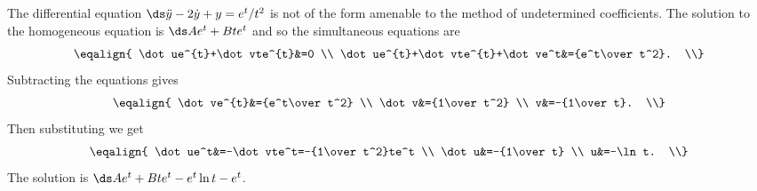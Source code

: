 \begin{example} The differential equation $\ds\ddot y -2\dot y+y=e^t/t^2$ is
not of the form amenable to the method of undetermined
coefficients. The solution to the homogeneous equation is
$\ds Ae^t+Bte^t$ and so the simultaneous equations are
$$\eqalign{
\dot ue^{t}+\dot vte^{t}&=0 \\
\dot ue^{t}+\dot vte^{t}+\dot ve^t&={e^t\over t^2}. \\}
$$
Subtracting the equations gives
$$\eqalign{
\dot ve^{t}&={e^t\over t^2} \\
\dot v&={1\over t^2} \\
v&=-{1\over t}. \\}
$$
Then substituting we get
$$\eqalign{
\dot ue^t&=-\dot vte^t=-{1\over t^2}te^t \\
\dot u&=-{1\over t} \\
u&=-\ln t. \\}
$$
The solution is $\ds Ae^t+Bte^t-e^t\ln t-e^t$.
\end{example}

